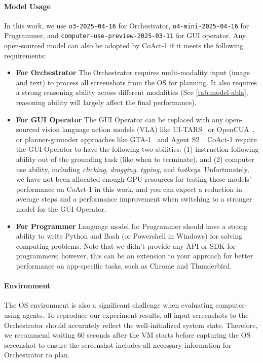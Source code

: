 \documentclass{article} %
\newcommand{\ours}{CoAct-1\xspace}
\begin{document}
\paragraph{Model Usage}
 In this work, we use \texttt{o3-2025-04-16} for Orchestrator, \texttt{o4-mini-2025-04-16} for Programmer, and \texttt{computer-use-preview-2025-03-11} for GUI operator. Any open-sourced model can also be adopted by \ours if it meets the following requirements:
\begin{itemize}[leftmargin=0.3cm, itemindent=0.3cm]
    \item \textbf{For Orchestrator} The Orchestrator requires multi-modality input (image and text) to process all screenshots from the OS for planning. It also requires a strong reasoning ability across different modalities (See \autoref{tab:model-abla}, reasoning ability will largely affect the final performance).
    \item \textbf{For GUI Operator} The GUI Operator can be replaced with any open-sourced vision language action models (VLA) like UI-TARS~\citep{qin2025ui} or OpenCUA~\citep{wang2025opencua}, or planner-grounder approaches like GTA-1~\citep{yang2025gta1guitesttimescaling} and Agent S2~\citep{agashe2025agent}. \ours require the GUI Operator to have the following two abilities: (1) instruction following ability out of the grounding task (like when to terminate), and (2) computer use ability, including \textit{clicking}, \textit{dragging}, \textit{typing}, and \textit{hotkeys}. Unfortunately, we have not been allocated enough GPU resources for testing these models' performance on \ours in this work, and you can expect a reduction in average steps and a performance improvement when switching to a stronger model for the GUI Operator.
    \item \textbf{For Programmer} Language model for Programmer should have a strong ability to write Python and Bash (or Powershell in Windows) for solving computing problems. Note that we didn't provide any API or SDK for programmers; however, this can be an extension to your approach for better performance on app-specific tasks, such as Chrome and Thunderbird.
\end{itemize}

\paragraph{Environment}
The OS environment is also a significant challenge when evaluating computer-using agents. To reproduce our experiment results, all input screenshots to the Orchestrator should accurately reflect the well-initialized system state. Therefore, we recommend waiting 60 seconds after the VM starts before capturing the OS screenshot to ensure the screenshot includes all necessary information for Orchestrator to plan. 
\end{document}

